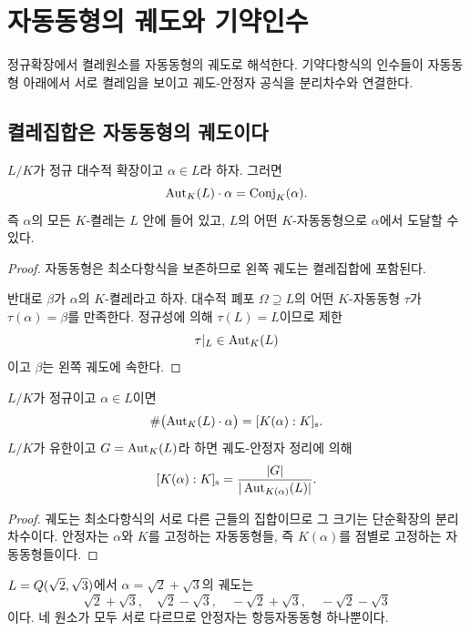 \clearpage
\section{자동동형의 궤도와 기약인수}
\label{sec:normal-orbits-factorization}

\begin{learninggoal}
정규확장에서 켤레원소를 자동동형의 궤도로 해석한다. 기약다항식의 인수들이 자동동형 아래에서 서로 켤레임을 보이고 궤도-안정자 공식을 분리차수와 연결한다.
\end{learninggoal}

\subsection{켤레집합은 자동동형의 궤도이다}

\begin{theorem}
$L/K$가 정규 대수적 확장이고 $\alpha\in L$라 하자. 그러면
\[
  \operatorname{Aut}_K(L)\cdot\alpha
  =\operatorname{Conj}_K(\alpha).
\]
즉 $\alpha$의 모든 $K$-켤레는 $L$ 안에 들어 있고, $L$의 어떤 $K$-자동동형으로 $\alpha$에서 도달할 수 있다.
\end{theorem}

\begin{proof}
자동동형은 최소다항식을 보존하므로 왼쪽 궤도는 켤레집합에 포함된다.

반대로 $\beta$가 $\alpha$의 $K$-켤레라고 하자. 대수적 폐포 $\Omega\supseteq L$의 어떤 $K$-자동동형 $\tau$가 $\tau(\alpha)=\beta$를 만족한다. 정규성에 의해 $\tau(L)=L$이므로 제한
\[
  \tau|_L\in\operatorname{Aut}_K(L)
\]
이고 $\beta$는 왼쪽 궤도에 속한다.
\end{proof}

\begin{corollary}
$L/K$가 정규이고 $\alpha\in L$이면
\[
  \#\bigl(\operatorname{Aut}_K(L)\cdot\alpha\bigr)
  =[K(\alpha):K]_{\mathrm s}.
\]
$L/K$가 유한이고 $G=\operatorname{Aut}_K(L)$라 하면 궤도-안정자 정리에 의해
\[
  [K(\alpha):K]_{\mathrm s}
  =\frac{|G|}{|\operatorname{Aut}_{K(\alpha)}(L)|}.
\]
\end{corollary}

\begin{proof}
궤도는 최소다항식의 서로 다른 근들의 집합이므로 그 크기는 단순확장의 분리차수이다. 안정자는 $\alpha$와 $K$를 고정하는 자동동형들, 즉 $K(\alpha)$를 점별로 고정하는 자동동형들이다.
\end{proof}

\begin{example}
$L=Q(\sqrt2,\sqrt3)$에서 $\alpha=\sqrt2+\sqrt3$의 궤도는
\[
  \sqrt2+\sqrt3,\quad
  \sqrt2-\sqrt3,\quad
  -\sqrt2+\sqrt3,\quad
  -\sqrt2-\sqrt3
\]
이다. 네 원소가 모두 서로 다르므로 안정자는 항등자동동형 하나뿐이다.
\end{example}


